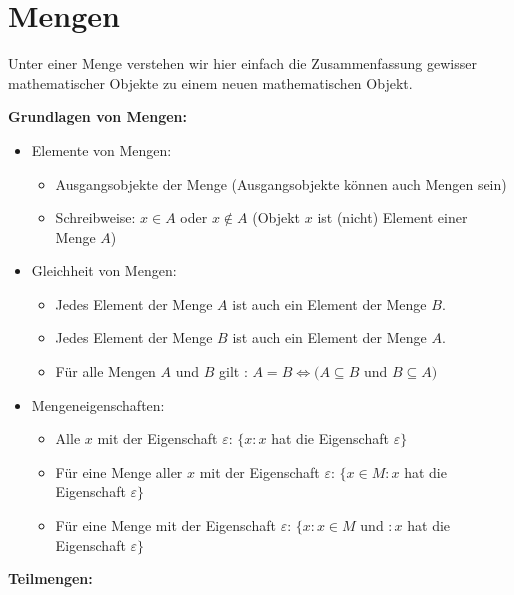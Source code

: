 \documentclass[analysis.tex]{subfiles}
\begin{document}
  \section{Mengen}
  \begin{definition}[Mengen]
    Unter einer Menge verstehen wir hier einfach die Zusammenfassung gewisser mathematischer Objekte zu einem neuen mathematischen Objekt.
  \end{definition}

  \begin{description}
    \item \textbf{Grundlagen von Mengen:}
    \begin{itemize}
      \item Elemente von Mengen:
      \begin{itemize}
        \item Ausgangsobjekte der Menge (Ausgangsobjekte k\"onnen auch Mengen sein)
        \item Schreibweise: $x \in A$ oder $x \notin A$ (Objekt $x$ ist (nicht) Element einer Menge $A$)
      \end{itemize}
      \item Gleichheit von Mengen:
      \begin{itemize}
              \item Jedes Element der Menge $A$ ist auch ein Element der Menge $B$.
              \item Jedes Element der Menge $B$ ist auch ein Element der Menge $A$.
        \item F\"ur alle Mengen $A$ und $B$ gilt : $A = B \Leftrightarrow (A \subseteq B$ und $B \subseteq A)$
      \end{itemize}
      \item Mengeneigenschaften:
      \begin{itemize}
        \item Alle $x$ mit der Eigenschaft $\varepsilon$: $\{x : x$ hat die Eigenschaft $\varepsilon\}$
        \item F\"ur eine Menge aller $x$ mit der Eigenschaft $\varepsilon$: $\{x \in M : x$ hat die Eigenschaft $\varepsilon\}$
        \item F\"ur eine Menge mit der Eigenschaft $\varepsilon$: $\{x : x \in M$ und $: x$ hat die Eigenschaft $\varepsilon\}$
      \end{itemize}
    \end{itemize}
    \item \textbf{Teilmengen:}
    \begin{definition}[Teilmengen]

\end{definition}
\end{description}
\end{document}
